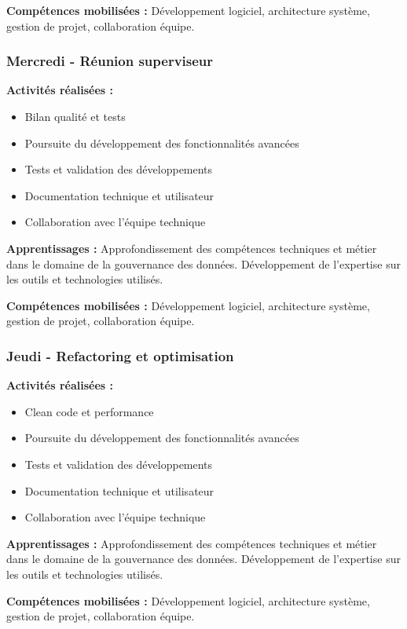 \textbf{Compétences mobilisées :}
Développement logiciel, architecture système, gestion de projet, collaboration équipe.

\subsubsection{Mercredi - Réunion superviseur}

\textbf{Activités réalisées :}
\begin{itemize}
    \item Bilan qualité et tests
    \item Poursuite du développement des fonctionnalités avancées
    \item Tests et validation des développements
    \item Documentation technique et utilisateur
    \item Collaboration avec l'équipe technique
\end{itemize}

\textbf{Apprentissages :}
Approfondissement des compétences techniques et métier dans le domaine de la gouvernance des données. Développement de l'expertise sur les outils et technologies utilisés.

\textbf{Compétences mobilisées :}
Développement logiciel, architecture système, gestion de projet, collaboration équipe.

\subsubsection{Jeudi - Refactoring et optimisation}

\textbf{Activités réalisées :}
\begin{itemize}
    \item Clean code et performance
    \item Poursuite du développement des fonctionnalités avancées
    \item Tests et validation des développements
    \item Documentation technique et utilisateur
    \item Collaboration avec l'équipe technique
\end{itemize}

\textbf{Apprentissages :}
Approfondissement des compétences techniques et métier dans le domaine de la gouvernance des données. Développement de l'expertise sur les outils et technologies utilisés.

\textbf{Compétences mobilisées :}
Développement logiciel, architecture système, gestion de projet, collaboration équipe.

